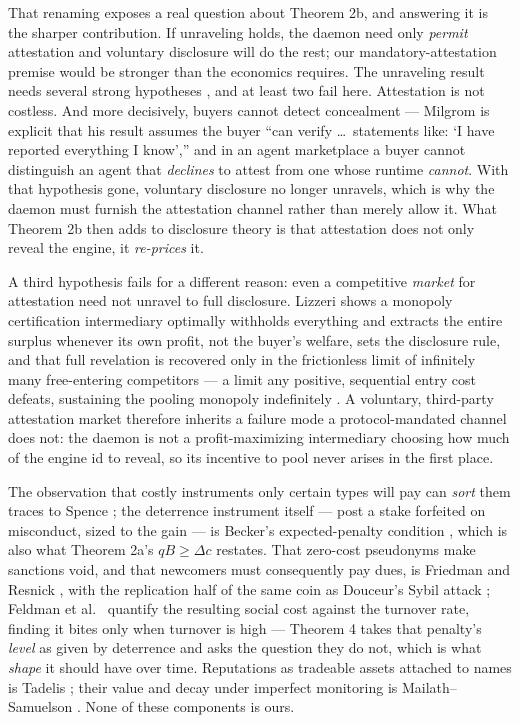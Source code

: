 \documentclass[11pt,a4paper]{article}
\begin{document}
That renaming exposes a real question about Theorem 2b, and answering it is the sharper contribution. If unraveling holds, the
daemon need only \emph{permit} attestation and voluntary disclosure will do the rest; our mandatory-attestation premise would be
stronger than the economics requires. The unraveling result needs several strong hypotheses \cite{dranove-jin}, and at least two
fail here. Attestation is not costless. And more decisively, buyers cannot detect concealment --- Milgrom is explicit that his
result assumes the buyer ``can verify \dots\ statements like: `I have reported everything I know','' and in an agent marketplace
a buyer cannot distinguish an agent that \emph{declines} to attest from one whose runtime \emph{cannot}. With that hypothesis
gone, voluntary disclosure no longer unravels, which is why the daemon must furnish the attestation channel rather than merely
allow it. What Theorem 2b then adds to disclosure theory is that attestation does not only reveal the engine, it \emph{re-prices}
it.

A third hypothesis fails for a different reason: even a competitive \emph{market} for attestation need not unravel to full
disclosure. Lizzeri shows a monopoly certification intermediary optimally withholds everything and extracts the entire surplus
whenever its own profit, not the buyer's welfare, sets the disclosure rule, and that full revelation is recovered only in the
frictionless limit of infinitely many free-entering competitors --- a limit any positive, sequential entry cost defeats,
sustaining the pooling monopoly indefinitely \cite{lizzeri99}. A voluntary, third-party attestation market therefore inherits a
failure mode a protocol-mandated channel does not: the daemon is not a profit-maximizing intermediary choosing how much of the
engine id to reveal, so its incentive to pool never arises in the first place.

The observation that costly instruments only certain types will pay can \emph{sort} them traces to Spence \cite{spence}; the
deterrence instrument itself --- post a stake forfeited on misconduct, sized to the gain --- is Becker's expected-penalty
condition \cite{becker1968}, which is also what Theorem 2a's $qB\ge\Delta c$ restates. That zero-cost pseudonyms make sanctions
void, and that newcomers must consequently pay dues, is Friedman and Resnick \cite{friedman-resnick}, with the replication half
of the same coin as Douceur's Sybil attack \cite{douceur}; Feldman et al.\ \cite{feldman2004} quantify the resulting social cost
against the turnover rate, finding it bites only when turnover is high --- Theorem 4 takes that penalty's \emph{level} as given
by deterrence and asks the question they do not, which is what \emph{shape} it should have over time. Reputations as tradeable
assets attached to names is Tadelis \cite{tadelis}; their value and decay under imperfect monitoring is Mailath--Samuelson
\cite{mailath-samuelson}. None of these components is ours.
\end{document}
